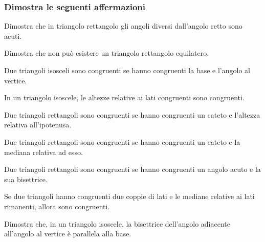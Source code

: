 \begin{multicols}{2}

\subsubsection*{Dimostra le seguenti affermazioni}

\begin{esercizio}
\label{ese:3.47}
Dimostra che in triangolo rettangolo gli angoli diversi dall'angolo retto sono acuti.
\end{esercizio}

\begin{esercizio}
\label{ese:3.48}
Dimostra che non può esistere un triangolo rettangolo equilatero.
\end{esercizio}

\begin{esercizio}
\label{ese:3.49}
Due triangoli isosceli sono congruenti se hanno congruenti la base e l'angolo al vertice.
\end{esercizio}

\begin{esercizio}
\label{ese:3.50}
In un triangolo isoscele, le altezze relative ai lati congruenti sono congruenti. 
\end{esercizio}

\begin{esercizio}
\label{ese:3.51}
Due triangoli rettangoli sono congruenti se hanno congruenti un cateto e l'altezza relativa all'ipotenusa.
\end{esercizio}

\begin{esercizio}
\label{ese:3.52}
Due triangoli rettangoli sono congruenti se hanno congruenti un cateto e la mediana relativa ad esso.
\end{esercizio}

\begin{esercizio}
\label{ese:3.53}
Due triangoli rettangoli sono congruenti se hanno congruenti un angolo acuto e la sua bisettrice.
\end{esercizio}

\begin{esercizio}
\label{ese:3.54}
Se due triangoli hanno congruenti due coppie di lati e le mediane relative ai lati rimanenti, allora sono congruenti.
\end{esercizio}

\begin{esercizio}
\label{ese:3.55}
Dimostra che, in un triangolo isoscele, la bisettrice dell'angolo adiacente all'angolo al vertice è parallela alla base.
\end{esercizio}


\end{multicols}
